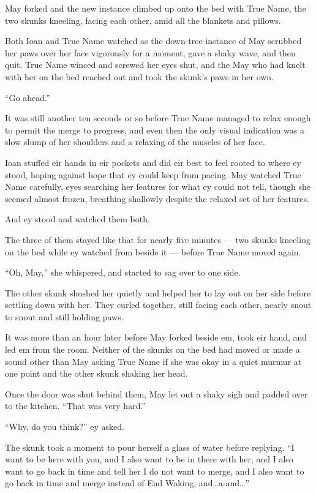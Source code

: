 May forked and the new instance climbed up onto the bed with True Name, the two skunks kneeling, facing each other, amid all the blankets and pillows.

Both Ioan and True Name watched as the down-tree instance of May scrubbed her paws over her face vigorously for a moment, gave a shaky wave, and then quit. True Name winced and screwed her eyes shut, and the May who had knelt with her on the bed reached out and took the skunk's paws in her own.

``Go ahead.''

It was still another ten seconds or so before True Name managed to relax enough to permit the merge to progress, and even then the only visual indication was a slow slump of her shoulders and a relaxing of the muscles of her face.

Ioan stuffed eir hands in eir pockets and did eir best to feel rooted to where ey stood, hoping against hope that ey could keep from pacing. May watched True Name carefully, eyes searching her features for what ey could not tell, though she seemed almost frozen, breathing shallowly despite the relaxed set of her features.

And ey stood and watched them both.

The three of them stayed like that for nearly five minutes — two skunks kneeling on the bed while ey watched from beside it — before True Name moved again.

``Oh, May,'' she whispered, and started to sag over to one side.

The other skunk shushed her quietly and helped her to lay out on her side before settling down with her. They curled together, still facing each other, nearly snout to snout and still holding paws.

It was more than an hour later before May forked beside em, took eir hand, and led em from the room. Neither of the skunks on the bed had moved or made a sound other than May asking True Name if she was okay in a quiet murmur at one point and the other skunk shaking her head.

Once the door was shut behind them, May let out a shaky sigh and padded over to the kitchen. ``That was very hard.''

``Why, do you think?'' ey asked.

The skunk took a moment to pour herself a glass of water before replying. ``I want to be here with you, and I also want to be in there with her, and I also want to go back in time and tell her I do not want to merge, and I also want to go back in time and merge instead of End Waking, and\ldots a-and\ldots{}''

